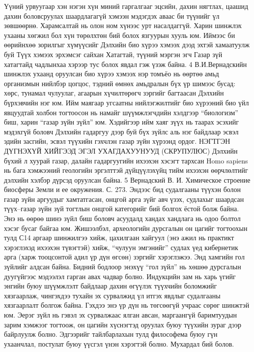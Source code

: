 Үүний урвуугаар хэн нэгэн хүн миний гаргалгааг эцсийн, дахин нягтлах, цаашид дахин боловсруулах шаардлагагүй хэмээн мэдэгдэх аваас би түүнийг үл зөвшөөрнө. Харамсалтай нь олон ном хүнээс урт насалдаггүй. Харин шинжлэх ухааны хөгжил бол хүн төрөлхтөн бий болох язгуурын хууль юм. Иймээс би өөрийнхөө зорилгыг хүмүүсийг Дэлхийн био хүрээ хэмээх дээд эхтэй хамаатуулж буй Түүх хэмээх эрхэмсэг сайхан Хатагтай, түүний мэргэн эгч Газар зүй хатагтайд чадлынхаа хэрээр тус болох явдал гэж үзэж байна.
4 В.И.Вернадскийн шинжлэх ухаанд оруулсан био хүрээ хэмээх нэр томъёо нь өөртөө амьд организмын нийлбэр цогцос, тэдний өмнөх амьдралын бүх үр шимээс бусад: хөрс, тунамал чулуулаг, агаарын хүчилтөрөгч зэргийг багтаасан Дэлхийн бүрхэвчийн нэг юм. Ийм маягаар угсаатны нийлэгжилтийг био хүрээний био үйл явцуудтай холбон тогтоосон нь намайг шүүмжлэгчдийн хэлдгээр “биологизм” биш, харин “газар зүйн зүйл” юм. Хэдийгээр ийм хаяг зүүх нь таарах эсэхийг мэдэхгүй боловч Дэлхийн гадаргуу дээр буй бүх зүйлс аль нэг байдлаар эсвэл эдийн засгийн, эсвэл түүхийн гэхчлэн газар зүйн хүрээнд ордог.
НЭГТГЭН ДҮГНЭХҮЙ ХИЙГЭЭД ЭГЭЛ УХАГДАХУУНУУД (СКРУПУЛЮС)
Дэлхийн бүхий л хуурай газар, далайн гадаргуугийн ихээхэн хэсэгт тархсан Homo sapiens нь бага хэмжээний геологийн эргэлттэй дүйцүүлэхүйц тийм ихээхэн өөрчлөлтийг дэлхийн хэлбэр дүрсэд оруулсан байна.
5 Вернадский В. И. Химическое строение биосферы Земли и ее окружения. С. 273.
Эндээс бид судалгааны түүхэн болон газар зүйн аргуудыг хамтатгасан, онцгой арга зүйг авч үзэх, судлахыг шаардсан түүх–газар зүйн зүй тогтлын онцгой категорийг бий болгох ёстой болж байна. Энэ нь өөрөө шинэ зүйл биш боловч асуудалд хандах хандлага нь одоо болтол хэсэг бусаг байгаа юм. Жишээлбэл, археологийн дурсгалын он цагийг тогтоохын тулд С14 аргаар шинжилгээ хийж, цахилгаан хайгуул (энэ ажил нь практикт хэрэглэхэд ихээхэн түвэгтэй) хийж, “чулуун эмгэнийг” судлах үед кибернетик арга (харж тооцсонтой адил үр дүн өгсөн) зэргийг хэрэглэжээ. Энд хамгийн гол зүйлийг алдсан байна. Бидний бодлоор энэхүү “гол зүйл” нь хөшөө дурсгалын дуугүйгээс мэдээлэл гарган авах чадвар болно. Индукцийн зам нь харь үгийг энгийн буюу шүүмжлэлт байдлаар дахин өгүүлэх түүхчийн боломжийг хязгаарлаж, чингэхдээ тухайн эх сурвалжид үл итгэх явдлыг судалгааны хязгаарлалт болгож байна. Гэхдээ энэ үр дүн нь төгсөөгүй учраас сөрөг шинжтэй юм. Эерэг зүйл нь гэвэл эх сурвалжаас ялган авсан, маргаангүй баримтуудын зарим хэмжээг тогтоож, он цагийн хүснэгтэд оруулах буюу түүхийн зураг дээр байрлуулж болно. Эдгээрийг тайлбарлахын тулд философема буюу гүн ухаанчлал, постулат буюу үүсгэл үнэн хэрэгтэй болно. Мухардал бий болов.
